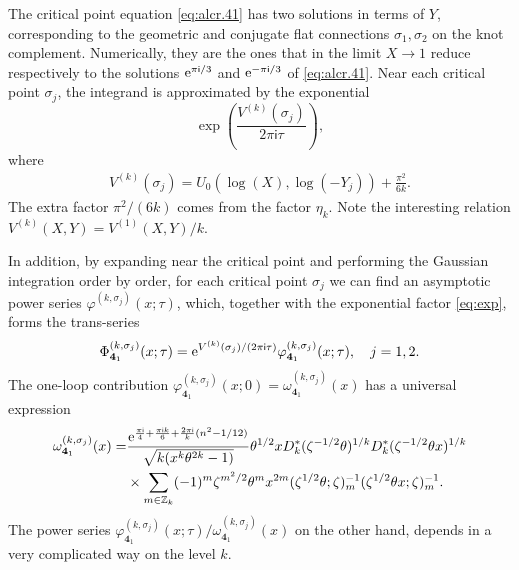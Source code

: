 \documentclass[a4paper,11pt]{article}	%
\def\md{\mathbf}
\def\IZ{\mathbb{Z}}
\newcommand{\re}{{\rm e}}
\newcommand{\ri}{{\mathsf{i}}}
\newcommand{\nn}{\nonumber \\}
\newcommand{\s}{\sigma}
\newcommand{\knot}[1]{\md{#1}}
\begin{document}
The critical point equation \eqref{eq:alcr.41} has two solutions in
terms of $Y$, corresponding to the geometric and conjugate flat
connections $\s_1, \s_2$ on the knot complement.
%
Numerically, they are the ones that in the limit $X\rightarrow 1$
reduce respectively to the solutions $\re^{\pi\ri/3}$ and
$\re^{-\pi\ri/3}$ of \eqref{eq:alcr.41}.
%
Near each critical point $\s_j$, the integrand is approximated by the
exponential
\begin{equation}
  \exp\left(\frac{V^{(k)}(\s_j)}{2\pi\ri\tau}\right),
  \label{eq:exp}
\end{equation}
where
\begin{align}
  V^{(k)}(\s_j) = U_0(\log(X),\log(-Y_j))+\frac{\pi^2}{6k}.
\end{align}
The extra factor $\pi^2/(6k)$ comes from the factor $\eta_k$.
Note the interesting relation $V^{(k)}(X,Y) = V^{(1)}(X,Y)/k$.

In addition, by expanding near the critical point and performing the
Gaussian integration order by order, for each critical point $\s_j$ we
can find an asymptotic power series $\varphi^{(k,\s_j)}(x;\tau)$,
which, together with the exponential factor \eqref{eq:exp}, forms the
trans-series
\begin{equation}
  \Phi_{\knot{4}_1}^{(k,\sigma_j)}(x;\tau) =
  \re^{V^{(k)}(\s_j)/(2\pi\ri\tau)}
  \varphi_{\knot{4}_1}^{(k,\s_j)}(x;\tau),\quad
  j=1,2.
\end{equation}
The one-loop contribution
$\varphi_{\knot{4}_1}^{(k,\s_j)}(x;0) =
\omega^{(k,\s_j)}_{\knot{4}_1}(x)$ has a universal
expression
\begin{align}
  \omega^{(k,\s_j)}_{\knot{4}_1}(x)=
  &\frac{\re^{\frac{\pi\ri}{4}+\frac{\pi\ri  k}{6}+\frac{2\pi\ri}{k}(n^2-1/12)}}
    {\sqrt{k(x^k\theta^{2k}-1)}}\theta^{1/2}x
    D_k^{*}(\zeta^{-1/2}\theta)^{1/k}
    D_k^{*}(\zeta^{-1/2}\theta x)^{1/k}\nn
  &\times\sum_{m\in\IZ_k}
    (-1)^m\zeta^{m^2/2}\theta^m x^{2m}
    (\zeta^{1/2}\theta;\zeta)_m^{-1}(\zeta^{1/2}\theta x;\zeta)_m^{-1}.
\end{align}
The power series
$\varphi_{\knot{4}_1}^{(k,\s_j)}(x;\tau)/\omega^{(k,\s_j)}_{\knot{4}_1}(x)$
on the other hand, depends in a very complicated way on the level $k$.
%
\end{document}
